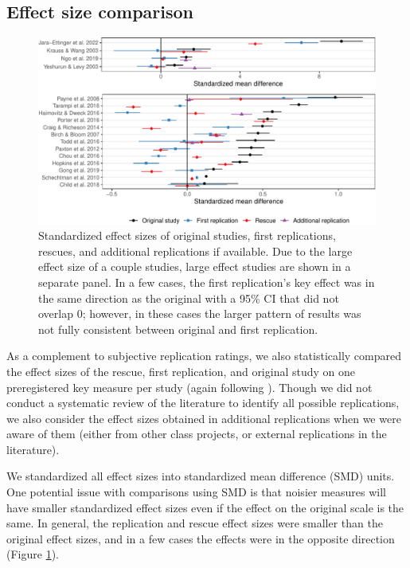 \documentclass[
  english,
  a4paper,
]{article}
\begin{document}
\subsection{Effect size comparison}\label{effect-size-comparison}

\begin{figure}
\includegraphics[width=1\linewidth]{manuscript_files/figure-latex/smd-1} \caption{Standardized effect sizes of original studies, first replications, rescues, and additional replications if available. Due to the large effect size of a couple studies, large effect studies are shown in a separate panel. In a few cases, the first replication's key effect was in the same direction as the original with a 95\% CI that did not overlap 0; however, in these cases the larger pattern of results was not fully consistent between original and first replication.  }\label{fig:smd}
\end{figure}

As a complement to subjective replication ratings, we also statistically compared the effect sizes of the rescue, first replication, and original study on one preregistered key measure per study (again following ).
Though we did not conduct a systematic review of the literature to identify all possible replications, we also consider the effect sizes obtained in additional replications when we were aware of them (either from other class projects, or external replications in the literature).

We standardized all effect sizes into standardized mean difference (SMD) units.
One potential issue with comparisons using SMD is that noisier measures will have smaller standardized effect sizes even if the effect on the original scale is the same.
In general, the replication and rescue effect sizes were smaller than the original effect sizes, and in a few cases the effects were in the opposite direction (Figure \ref{fig:smd}).
\end{document}

